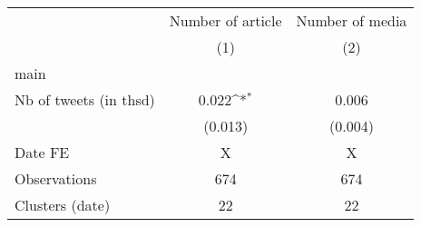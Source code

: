 {
\def\sym#1{\ifmmode^{#1}\else\(^{#1}\)\fi}
\begin{tabular}{l*{2}{c}}
\hline\hline
                    &\multicolumn{1}{c}{Number of article}&\multicolumn{1}{c}{Number of media}\\\cmidrule(lr){2-2}\cmidrule(lr){3-3}
                    &\multicolumn{1}{c}{(1)}         &\multicolumn{1}{c}{(2)}         \\
\hline
main                &                     &                     \\
Nb of tweets (in thsd)&       0.022\sym{*}  &       0.006         \\
                    &     (0.013)         &     (0.004)         \\
\hline
Date FE             &           X         &           X         \\
Observations        &         674         &         674         \\
Clusters (date)     &          22         &          22         \\
\hline\hline
\end{tabular}
}
